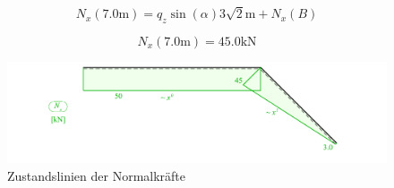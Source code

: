 \documentclass[
  12pt,
  letterpaper,
  DIV=11,
  egregdoesnotlikesansseriftitles]{scrartcl}
\begin{document}
\begin{equation}N_{x}{\left(7.0 \text{m} \right)} = q_{z} \sin{\left(\alpha \right)} 3 \sqrt{2} \text{m} + N_{x}{\left(B \right)}\end{equation}

\begin{equation}N_{x}{\left(7.0 \text{m} \right)} = 45.0 \text{k} \text{N}\end{equation}

\begin{figure}[H]

{\centering \includegraphics{BSI_HS23_Testat_02_files/mediabag/../images/Testat_02_HS23_Nx.pdf}

}

\caption{Zustandslinien der Normalkräfte}

\end{figure}
\end{document}
